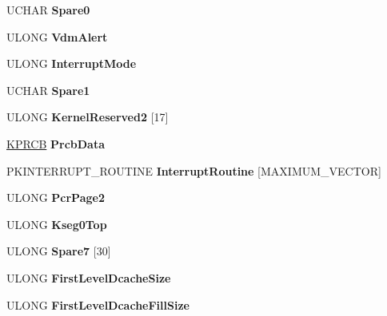 \begin{DoxyCompactItemize}
U\+C\+H\+AR {\bfseries Spare0}
\item 
\mbox{\label{struct___k_i_p_c_r_aecea0f8df7ea6eb16f3ecf65a363c909}} 
U\+L\+O\+NG {\bfseries Vdm\+Alert}
\item 
\mbox{\label{struct___k_i_p_c_r_a705253d34baafccfff5e489c608b69ae}} 
U\+L\+O\+NG {\bfseries Interrupt\+Mode}
\item 
\mbox{\label{struct___k_i_p_c_r_a6395e732bb984098af070522294742e2}} 
U\+C\+H\+AR {\bfseries Spare1}
\item 
\mbox{\label{struct___k_i_p_c_r_a5e249062b8a147922219c1cd6db336ae}} 
U\+L\+O\+NG {\bfseries Kernel\+Reserved2} \mbox{[}17\mbox{]}
\item 
\mbox{\label{struct___k_i_p_c_r_a45eea1315dc64fe05a14d6492c4fcece}} 
\hyperlink{struct___k_p_r_c_b}{K\+P\+R\+CB} {\bfseries Prcb\+Data}
\item 
\mbox{\label{struct___k_i_p_c_r_ad738549775fd4a3092739eb845a87d79}} 
P\+K\+I\+N\+T\+E\+R\+R\+U\+P\+T\+\_\+\+R\+O\+U\+T\+I\+NE {\bfseries Interrupt\+Routine} \mbox{[}M\+A\+X\+I\+M\+U\+M\+\_\+\+V\+E\+C\+T\+OR\mbox{]}
\item 
\mbox{\label{struct___k_i_p_c_r_ac4504d24cd089573e23d969902b4744d}} 
U\+L\+O\+NG {\bfseries Pcr\+Page2}
\item 
\mbox{\label{struct___k_i_p_c_r_a73609c76ebc21842e3374a9251d77a4e}} 
U\+L\+O\+NG {\bfseries Kseg0\+Top}
\item 
\mbox{\label{struct___k_i_p_c_r_aaf89f113f705a7adb32a88eab6a6d5b4}} 
U\+L\+O\+NG {\bfseries Spare7} \mbox{[}30\mbox{]}
\item 
\mbox{\label{struct___k_i_p_c_r_adf6042bcce37668acb793c9bd0b5fdf2}} 
U\+L\+O\+NG {\bfseries First\+Level\+Dcache\+Size}
\item 
\mbox{\label{struct___k_i_p_c_r_ac570db53f4e6a3eb2bd0d95fd7d3c937}} 
U\+L\+O\+NG {\bfseries First\+Level\+Dcache\+Fill\+Size}

\end{DoxyCompactItemize}
